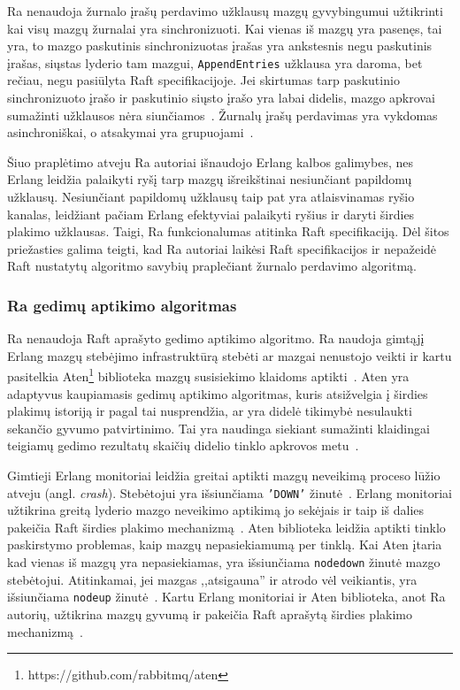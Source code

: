 \documentclass{VUMIFPSkursinis}
\begin{document}
Ra nenaudoja žurnalo įrašų perdavimo užklausų mazgų gyvybingumui užtikrinti kai visų mazgų žurnalai yra sinchronizuoti. Kai vienas iš mazgų yra pasenęs, tai yra, to mazgo paskutinis sinchronizuotas įrašas yra ankstesnis negu paskutinis įrašas, siųstas lyderio tam mazgui, \texttt{AppendEntries} užklausa yra daroma, bet rečiau, negu pasiūlyta Raft specifikacijoje. Jei skirtumas tarp paskutinio sinchronizuoto įrašo ir paskutinio siųsto įrašo yra labai didelis, mazgo apkrovai sumažinti užklausos nėra siunčiamos~\cite{rabbitmqra}. Žurnalų įrašų perdavimas yra vykdomas asinchroniškai, o atsakymai yra grupuojami~\cite{rabbitmqra}.

Šiuo praplėtimo atveju Ra autoriai išnaudojo Erlang kalbos galimybes, nes Erlang leidžia palaikyti ryšį tarp mazgų išreikštinai nesiunčiant papildomų užklausų. Nesiunčiant papildomų užklausų taip pat yra atlaisvinamas ryšio kanalas, leidžiant pačiam Erlang efektyviai palaikyti ryšius ir daryti širdies plakimo užklausas. Taigi, Ra funkcionalumas atitinka Raft specifikaciją. Dėl šitos priežasties galima teigti, kad Ra autoriai laikėsi Raft specifikacijos ir nepažeidė Raft nustatytų algoritmo savybių praplečiant žurnalo perdavimo algoritmą.      

\subsubsection{Ra gedimų aptikimo algoritmas}

Ra nenaudoja Raft aprašyto gedimo aptikimo algoritmo. Ra naudoja gimtąjį Erlang mazgų stebėjimo infrastruktūrą stebėti ar mazgai nenustojo veikti ir kartu pasitelkia Aten\footnote{https://github.com/rabbitmq/aten} biblioteka mazgų susisiekimo klaidoms aptikti~\cite{rabbitmqra}. Aten yra adaptyvus kaupiamasis gedimų aptikimo algoritmas, kuris atsižvelgia į širdies plakimų istoriją ir pagal tai nusprendžia, ar yra didelė tikimybė nesulaukti sekančio gyvumo patvirtinimo. Tai yra naudinga siekiant sumažinti klaidingai teigiamų gedimo rezultatų skaičių didelio tinklo apkrovos metu~\cite{satzger2007_new_accrual_failure}.  

Gimtieji Erlang monitoriai leidžia greitai aptikti mazgų neveikimą proceso lūžio atveju (angl. \textit{crash}). Stebėtojui yra išsiunčiama \texttt{'DOWN'} žinutė~\cite{ericsson_erlang_processes_2016}. Erlang monitoriai užtikrina greitą lyderio mazgo neveikimo aptikimą jo sekėjais ir taip iš dalies pakeičia Raft širdies plakimo mechanizmą~\cite{rabbitmqra}. Aten biblioteka leidžia aptikti tinklo paskirstymo problemas, kaip mazgų nepasiekiamumą per tinklą. Kai Aten įtaria kad vienas iš mazgų yra nepasiekiamas, yra išsiunčiama \texttt{nodedown} žinutė mazgo stebėtojui. Atitinkamai, jei mazgas ,,atsigauna'' ir atrodo vėl veikiantis, yra išsiunčiama \texttt{nodeup} žinutė~\cite{rabbitmq_aten_2020}. Kartu Erlang monitoriai ir Aten biblioteka, anot Ra autorių, užtikrina mazgų gyvumą ir pakeičia Raft aprašytą širdies plakimo mechanizmą~\cite{rabbitmqra}. 
\end{document}
